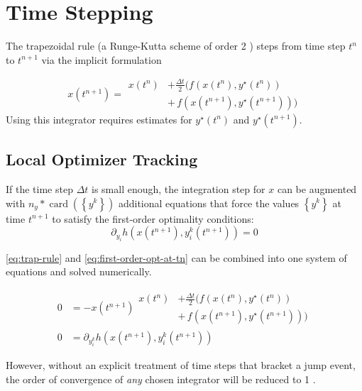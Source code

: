 \documentclass[twoside,leqno, twocolumn]{article}
\DeclareMathOperator{\card}{\mathrm{card}}
\begin{document}
\section{Time Stepping}
The trapezoidal rule (a Runge-Kutta scheme of order 2 \cite{butcherNumericalMethodsOrdinary2008}) steps from time step $t^n$ to $t^{n+1}$ via the implicit formulation

\begin{equation}
	\label{eq:trap-rule}
	x(t^{n+1}) = \begin{aligned}x(t^n) &+ \frac{\Delta t}{2}(f(x(t^n), y^\star(t^n))\\&+\, f(x(t^{n+1}), y^\star(t^{n+1})))\end{aligned}
\end{equation}
Using this integrator requires estimates for $y^\star(t^{n})$ and $y^\star(t^{n+1})$.

\subsection{Local Optimizer Tracking}
If the time step $\Delta t$ is small enough, the integration step for $x$ can be augmented with $n_y * \card\left(\left\{y^k\right\}\right)$ additional equations that force the values $\left\{y^k\right\}$ at time $t^{n+1}$ to satisfy the first-order optimality conditions:
\begin{equation}
	\label{eq:first-order-opt-at-tn}
	\partial_{y_i}h\left(x(t^{n+1}), y^k_i(t^{n+1})\right) = 0
\end{equation}
	
\eqref{eq:trap-rule} and \eqref{eq:first-order-opt-at-tn} can be combined into one system of equations and solved numerically.

\begin{equation}
	\label{eq:integrator-with-tracking}
	\begin{aligned}
		0 &= -x(t^{n+1}) \begin{aligned}x(t^n) &+ \frac{\Delta t}{2}(f(x(t^n), y^\star(t^n))\\&+\, f(x(t^{n+1}), y^\star(t^{n+1})))\end{aligned}\\
		0 &= \partial_{y^k_{i}}h(x(t^{n+1}), y_i^k(t^{n+1}))
	\end{aligned}
\end{equation}

However, without an explicit treatment of time steps that bracket a jump event, the order of convergence of \textit{any} chosen integrator will be reduced to 1 \cite{mannshardtOnestepMethodsAny1978}.
\end{document}
